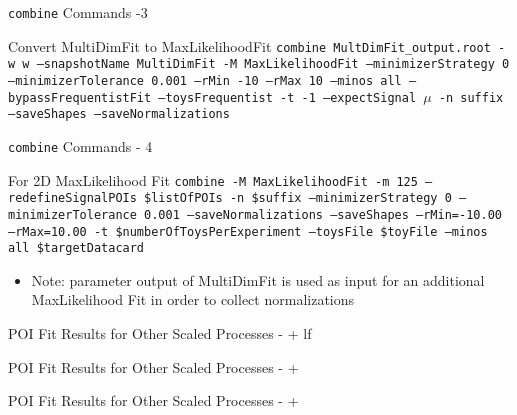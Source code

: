 \begin{frame}{\texttt{combine} Commands -3}
\begin{block}{Convert MultiDimFit to MaxLikelihoodFit}
\texttt{combine MultDimFit\_output.root -w w --snapshotName MultiDimFit -M MaxLikelihoodFit --minimizerStrategy 0 --minimizerTolerance 0.001 --rMin -10 --rMax 10 --minos all --bypassFrequentistFit --toysFrequentist -t -1 --expectSignal $\mu$ -n suffix --saveShapes --saveNormalizations}
\end{block}
\end{frame}

\begin{frame}{\texttt{combine} Commands - 4}
\begin{block}{For 2D MaxLikelihood Fit}
\texttt{combine -M MaxLikelihoodFit -m 125 --redefineSignalPOIs \$listOfPOIs -n \$suffix --minimizerStrategy 0 --minimizerTolerance 0.001 --saveNormalizations --saveShapes --rMin=-10.00 --rMax=10.00 -t \$numberOfToysPerExperiment --toysFile \$toyFile --minos all \$targetDatacard}
\end{block}
\begin{itemize}
\item Note: parameter output of MultiDimFit is used as input for an additional MaxLikelihood Fit in order to collect normalizations
\end{itemize}
\end{frame}


\begin{frame}{POI Fit Results for Other Scaled Processes - \ttbar + lf}
\begin{scriptsize}

\end{scriptsize}

\end{frame}

\begin{frame}{POI Fit Results for Other Scaled Processes - \ttbar + \ccbar}
\begin{scriptsize}

\end{scriptsize}

\end{frame}

\begin{frame}{POI Fit Results for Other Scaled Processes - \ttbar + \bbbar}
\vskip -0.3cm
\begin{scriptsize}

\end{scriptsize}

\end{frame}



